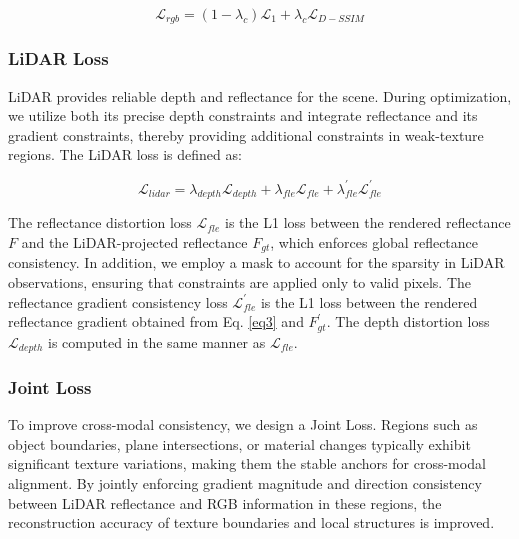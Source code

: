 \documentclass[letterpaper, 10 pt, conference]{ieeeconf}  %
\begin{document}
\begin{equation}
	\label{eq12}
\mathcal{L}_{rgb}=(1-\lambda_{c}) \mathcal{L}_{1}+\lambda_{c} \mathcal{L}_{D-SSIM}
\end{equation}

\subsubsection{LiDAR Loss}
LiDAR provides reliable depth and reflectance for the scene. During optimization, we utilize both its precise depth constraints and integrate reflectance and its gradient constraints, thereby providing additional constraints in weak-texture regions. The LiDAR loss is defined as:

\begin{equation}
	\label{eq13}
\mathcal{L}_{lidar}= \lambda_{depth}\mathcal{L}_{depth} + \lambda_{fle}\mathcal{L}_{fle} + \lambda_{fle}^{\prime}\mathcal{L}_{fle}^{\prime}
\end{equation}



The reflectance distortion loss $\mathcal{L}_{fle}$ is the L1 loss between the rendered reflectance $F$ and the LiDAR-projected reflectance $F_{gt}$, which enforces global reflectance consistency. In addition, we employ a mask to account for the sparsity in LiDAR observations, ensuring that constraints are applied only to valid pixels. The reflectance gradient consistency loss $\mathcal{L}_{fle}^{\prime}$ is the L1 loss between the rendered reflectance gradient obtained from Eq. \eqref{eq3} and $F_{gt}^{\prime}$. The depth distortion loss $\mathcal{L}_{depth}$ is computed in the same manner as $\mathcal{L}_{fle}$. 




\subsubsection{Joint Loss}  
To improve cross-modal consistency, we design a Joint Loss. Regions such as object boundaries, plane intersections, or material changes typically exhibit significant texture variations, making them the stable anchors for cross-modal alignment. By jointly enforcing gradient magnitude and direction consistency between LiDAR reflectance and RGB information in these regions, the reconstruction accuracy of texture boundaries and local structures is improved.
\end{document}
